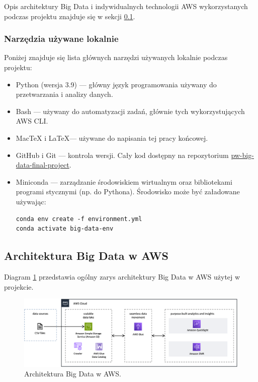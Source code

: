 \documentclass[12pt, a4paper]{article}
\begin{document}


Opis architektury Big Data i indywidualnych technologii AWS wykorzystanych podczas projektu znajduje się w sekcji \ref{sec:aws_architecture}.

\subsubsection{Narzędzia używane lokalnie}
Poniżej znajduje się lista głównych narzędzi używanych lokalnie podczas projektu:
\begin{itemize}
    \item Python (wersja 3.9) --- główny język programowania używany do przetwarzania i analizy danych.
    \item Bash --- używany do automatyzacji zadań, głównie tych wykorzystujących AWS CLI.
    \item MacTeX i \LaTeX --- używane do napisania tej pracy końcowej.
    \item GitHub i Git --- kontrola wersji. Cały kod dostępny na repozytorium \href{https://github.com/safurynp/pw-big-data-final-project}{pw-big-data-final-project}.
    \item Miniconda --- zarządzanie środowiskiem wirtualnym oraz bibliotekami programi stycznymi (np. do Pythona). Środowisko może być załadowane używając:
\begin{verbatim}
conda env create -f environment.yml
conda activate big-data-env
\end{verbatim}

\end{itemize}

\subsection{Architektura Big Data w AWS} \label{sec:aws_architecture}
Diagram \ref{fig:aws_architecture} przedstawia ogólny zarys architektury Big Data w AWS użytej w projekcie.
\begin{figure}[h]
    \includegraphics[width=\textwidth]{figures/aws_architecture.png}
    \caption{Architektura Big Data w AWS.}
    \label{fig:aws_architecture}
\end{figure}
\end{document}
